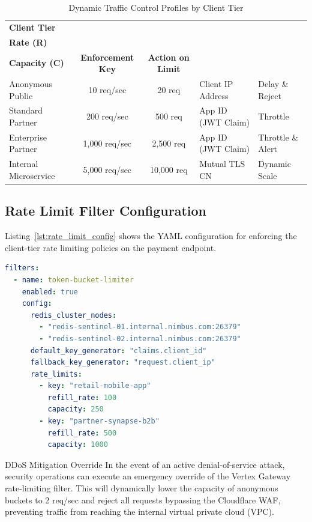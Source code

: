 \begin{table}[htbp]
\centering
\caption{Dynamic Traffic Control Profiles by Client Tier}
\label{tab:rate_limits}
\begin{tabularx}{\textwidth}{l c c X X}
\toprule
\textbf{Client Tier} & \begin{tabular}[c]{@{}c@{}}\textbf{Sustained}\\\textbf{Rate (R)}\end{tabular} & \begin{tabular}[c]{@{}c@{}}\textbf{Burst}\\\textbf{Capacity (C)}\end{tabular} & \textbf{Enforcement Key} & \textbf{Action on Limit} \\
\midrule
Anonymous Public & 10 req/sec & 20 req & Client IP Address & Delay \& Reject \\
Standard Partner & 200 req/sec & 500 req & App ID (JWT Claim) & Throttle \\
Enterprise Partner & 1,000 req/sec & 2,500 req & App ID (JWT Claim) & Throttle \& Alert \\
Internal Microservice & 5,000 req/sec & 10,000 req & Mutual TLS CN & Dynamic Scale \\
\bottomrule
\end{tabularx}
\end{table}

\subsection{Rate Limit Filter Configuration}
Listing~\ref{lst:rate_limit_config} shows the YAML configuration for enforcing the client-tier rate limiting policies on the payment endpoint.

\begin{lstlisting}[language=yaml, caption={YAML configuration for the Redis token-bucket rate limiter filter.}, label={lst:rate_limit_config}]
filters:
  - name: token-bucket-limiter
    enabled: true
    config:
      redis_cluster_nodes:
        - "redis-sentinel-01.internal.nimbus.com:26379"
        - "redis-sentinel-02.internal.nimbus.com:26379"
      default_key_generator: "claims.client_id"
      fallback_key_generator: "request.client_ip"
      rate_limits:
        - key: "retail-mobile-app"
          refill_rate: 100
          capacity: 250
        - key: "partner-synapse-b2b"
          refill_rate: 500
          capacity: 1000
\end{lstlisting}

\begin{warningbox}{DDoS Mitigation Override}
In the event of an active denial-of-service attack, security operations can execute an emergency override of the Vertex Gateway rate-limiting filter. This will dynamically lower the capacity of anonymous buckets to 2 req/sec and reject all requests bypassing the Cloudflare WAF, preventing traffic from reaching the internal virtual private cloud (VPC).
\end{warningbox}
